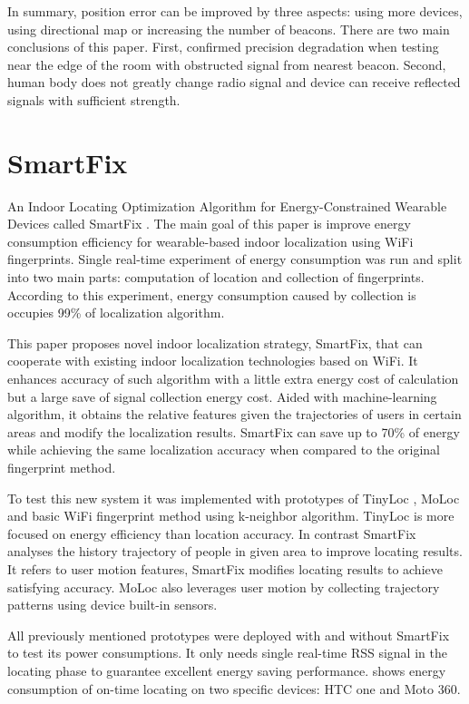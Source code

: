 In summary, position error can be improved by three aspects: using more devices, using directional map or increasing the number of beacons. There are two main conclusions of this paper. First, confirmed precision degradation when testing near the edge of the room with obstructed signal from nearest beacon. Second, human body does not greatly change radio signal and device can receive reflected signals with sufficient strength. 

\section{SmartFix}\label{sec:SmartFix}
An Indoor Locating Optimization Algorithm for Energy-Constrained Wearable Devices called SmartFix \cite{SmartFix}. The main goal of this paper is improve energy consumption efficiency for wearable-based indoor localization using WiFi fingerprints. Single real-time experiment of energy consumption was run and split into two main parts: computation of location and collection of fingerprints. According to this experiment, energy consumption caused by collection is occupies 99\% of localization algorithm.

This paper proposes novel indoor localization strategy, SmartFix, that can cooperate with existing indoor localization technologies based on WiFi. It enhances accuracy of such algorithm with a little extra energy cost of calculation but a large save of signal collection energy cost. Aided with machine-learning algorithm, it obtains the relative features given the trajectories of users in certain areas and modify the localization results. SmartFix can save up to 70\% of energy while achieving the same localization accuracy when compared to the original fingerprint method.

To test this new system it was implemented with prototypes of TinyLoc \cite{TinyLoc}, MoLoc \cite{MoLoc} and basic WiFi fingerprint method using k-neighbor algorithm. TinyLoc is more focused on energy efficiency than location accuracy. In contrast SmartFix analyses the history trajectory of people in given area to improve locating results. It refers to user motion features, SmartFix modifies locating results to achieve satisfying accuracy. MoLoc also leverages user motion by collecting trajectory patterns using device built-in sensors.

All previously mentioned prototypes were deployed with and without SmartFix to test its power consumptions. It only needs single real-time RSS signal in the
locating phase to guarantee excellent energy saving performance.  shows energy consumption of on-time locating on two specific devices: HTC one and Moto 360. 

